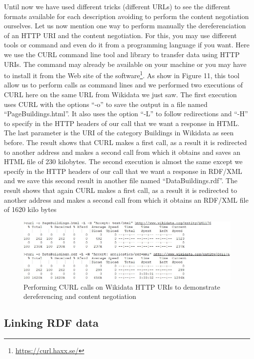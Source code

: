 Until now we have used different tricks (different URLs) to see the
different formats available for each description avoiding to perform the
content negotiation ourselves. Let us now mention one way to perform
manually the dereferenciation of an HTTP URI and the content
negotiation. For this, you may use different tools or command and even
do it from a programming language if you want. Here we use the CURL
command line tool and library to transfer data using HTTP URIs. The
command may already be available on your machine or you may have to
install it from the Web site of the software\footnote{\url{https://curl.haxx.se/}}.
As show in Figure 11, this tool allow us to perform calls as command
lines and we performed two executions of CURL here on the same URL from
Wikidata we just saw. The first execution uses CURL with the options
``-o'' to save the output in a file named ``PageBuildings.html''. It
also uses the option ``-L'' to follow redirections and ``-H'' to specify
in the HTTP headers of our call that we want a response in HTML. The
last parameter is the URI of the category Buildings in Wikidata as seen
before. The result shows that CURL makes a first call, as a result it is
redirected to another address and makes a second call from which it
obtains and saves an HTML file of 230 kilobytes. The second execution is
almost the same except we specify in the HTTP headers of our call that
we want a response in RDF/XML and we save this second result in another
file named ``DataBuildings.rdf''. The result shows that again CURL makes
a first call, as a result it is redirected to another address and makes
a second call from which it obtains an RDF/XML file of 1620 kilo bytes

\begin{figure}
    \centering
    \includegraphics[width=5.0in]{media/figure-05-11.jpg}
    \caption{Performing CURL calls on Wikidata HTTP URIs to demonstrate
dereferencing and content negotiation}
    \label{fig:ch5.11}
\end{figure}

\hypertarget{linking-rdf-data}{%
\subsection{Linking RDF data}\label{linking-rdf-data}}


